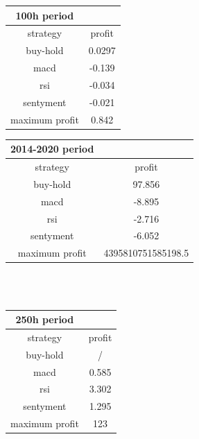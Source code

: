 \documentclass[a4paper,12pt]{report}
\begin{document}
\begin{fig}
\begin{fig}
	\begin{subfigure}{\linewidth}
		\begin{tabular}{||c c ||} 
			\hline\hline
			\textbf{100h period} & \\
			\hline\hline
			strategy & profit \\ [0.5ex] 
			\hline\hline
			buy-hold &  0.0297 \\
			\hline
			macd & -0.139 \\
			\hline
			rsi & -0.034 \\
			\hline
			sentyment & -0.021 \\
			\hline
			maximum profit & 0.842 \\ [1ex]
			\hline\hline
		\end{tabular}
		\begin{tabular}{||c c ||} 
			\hline\hline
			\textbf{2014-2020 period} & \\
			\hline\hline
			strategy & profit \\ [0.5ex] 
			\hline\hline
			buy-hold & 97.856 \\
			\hline
			macd & -8.895 \\
			\hline
			rsi & -2.716 \\
			\hline
			sentyment & -6.052 \\ 
			\hline
			maximum profit & 4395810751585198.5 \\ [1ex]
			\hline\hline
		\end{tabular}
		\\~\\
		\begin{tabular}{||c c ||} 
			\hline\hline
			\textbf{250h period} & \\		%
			\hline\hline
			strategy & profit \\ [0.5ex] 
			\hline\hline
			buy-hold &  / \\
			\hline
			macd & 0.585 \\
			\hline
			rsi & 3.302 \\
			\hline
			sentyment & 1.295 \\
			\hline
			maximum profit & 123 \\ [1ex]
			\hline\hline
		\end{tabular}
	\end{subfigure}
	\label{Tabella 5}
\end{fig}

\end{fig}
\end{document}
